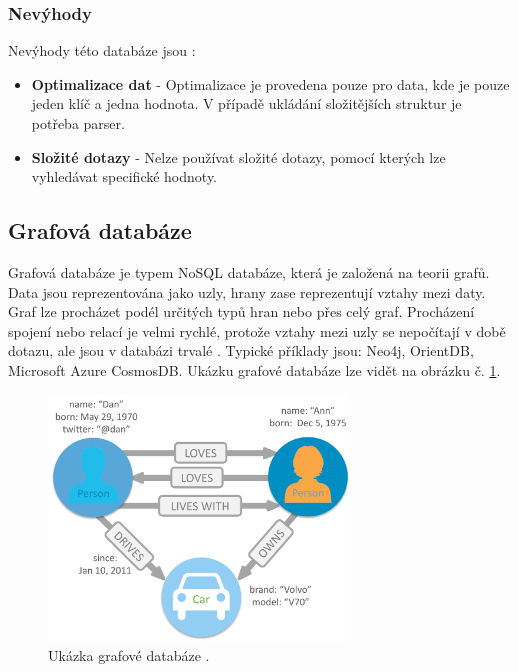 \subsubsection{Nevýhody}
Nevýhody této databáze jsou \cite{advantages_keyvalue}:
\begin{itemize}
\item \textbf{Optimalizace dat} - Optimalizace je provedena pouze pro data, kde je pouze jeden klíč a jedna hodnota. V případě ukládání složitějších struktur je potřeba parser. 
\item \textbf{Složité dotazy} - Nelze používat složité dotazy, pomocí kterých lze vyhledávat specifické hodnoty.
\end{itemize}

\subsection{Grafová databáze}
Grafová databáze je typem NoSQL databáze, která je založená na teorii grafů. Data jsou reprezentována jako uzly, hrany zase reprezentují vztahy mezi daty. Graf lze procházet podél určitých typů hran nebo přes celý graf. Procházení spojení nebo relací je velmi rychlé, protože vztahy mezi uzly se nepočítají v době dotazu, ale jsou v databázi trvalé \cite{nosqlDatabaseBook}. Typické příklady jsou: Neo4j, OrientDB, Microsoft Azure CosmosDB. Ukázku grafové databáze lze vidět na obrázku č. \ref{fig:db_img_graph}.
	\begin{figure}[H]
	\centering
	\includegraphics[width=8cm]{img/databaze/graph_db}
	\caption{Ukázka grafové databáze \cite{neo_graph}.}
	\label{fig:db_img_graph}
	\end{figure}

